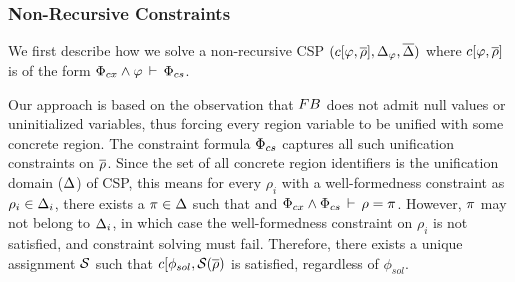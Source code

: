 \subsubsection{Non-Recursive Constraints}
\label{sec:csolve}

We first describe how we solve a non-recursive CSP $(c\lbrack \varphi,\overline{\rho} \rbrack,\Delta_{\varphi},\overline{\Delta})$ where
$c\lbrack \varphi,\overline{\rho} \rbrack$ is of the form $\Phi_{cx}
\wedge \varphi\,\vdash\,\Phi_{cs}$. 

Our approach is based on the observation that ${\sc FB}$ does not admit
null values or uninitialized variables, thus forcing every region
variable to be unified with some concrete region.
%
The constraint formula $\Phi_{cs}$ captures all such unification constraints on $\overline{\rho}$.
Since the set of all concrete region identifiers is the
unification domain ($\Delta$) of CSP, this means for every $\rho_i$
with a well-formedness constraint as $\rho_i \in \Delta_i$, there
exists a $\pi \in \Delta$ such that and $\Phi_{cx} \wedge
\Phi_{cs}\,\vdash\,\rho = \pi$. However, $\pi$ may not belong to $\Delta_i$,
in which case the well-formedness constraint on $\rho_i$ is not
satisfied, and constraint solving must fail.  Therefore, there exists
a unique assignment $\mathcal{S}$ such that $c\lbrack
\phi_{sol},\mathcal{S}(\overline{\rho})$ is satisfied, regardless of
$\phi_{sol}$.


